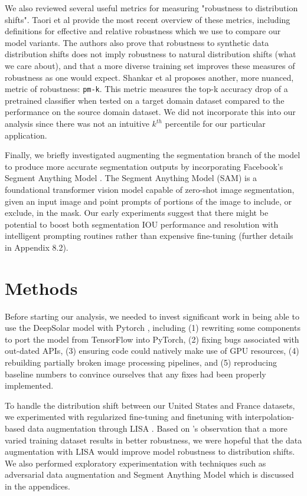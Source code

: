 \documentclass[10pt,twocolumn,letterpaper]{article}
\begin{document}
We also reviewed several useful metrics for measuring "robustness to distribution shifts". Taori et al \cite{Taori2020} provide the most recent overview of these metrics, including definitions for effective and relative robustness which we use to compare our model variants. The authors also prove that robustness to synthetic data distribution shifts does not imply robustness to natural distribution shifts (what we care about), and that a more diverse training set improves these measures of robustness as one would expect. Shankar et al \cite{shankar2019image} proposes another, more nuanced, metric of robustness: \texttt{pm-k}. This metric measures the top-k accuracy drop of a pretrained classifier when tested on a target domain dataset compared to the performance on the source domain dataset. We did not incorporate this into our analysis since there was not an intuitive $k^{th}$ percentile for our particular application.

Finally, we briefly investigated augmenting the segmentation branch of the model to produce more accurate segmentation outputs by incorporating Facebook's Segment Anything Model \cite{kirillov2023segment}. The Segment Anything Model  (SAM) is a foundational transformer vision model capable of zero-shot image segmentation, given an input image and point prompts of portions of the image to include, or exclude, in the mask. Our early experiments suggest that there might be potential to boost both segmentation IOU performance and resolution with intelligent prompting routines rather than expensive fine-tuning (further details in Appendix 8.2). 


\section{Methods}
Before starting our analysis, we needed to invest significant work in being able to use the DeepSolar model with Pytorch \cite{NEURIPS2019_9015}, including (1) rewriting some components to port the model from TensorFlow into PyTorch, (2) fixing bugs associated with out-dated APIs, (3) ensuring code could natively make use of GPU resources, (4) rebuilding partially broken image processing pipelines, and (5) reproducing baseline numbers to convince ourselves that any fixes had been properly implemented.

To handle the distribution shift between our United States and France datasets, we experimented with regularized fine-tuning \cite{li2021} and finetuning with interpolation-based data augmentation through LISA \cite{yao2022improving}. Based on \cite{Taori2020}'s observation that a more varied training dataset results in better robustness, we were hopeful that the data augmentation with LISA would improve model robustness to distribution shifts. We also performed exploratory experimentation with techniques such as adversarial data augmentation \cite{volpi2018generalizing} and Segment Anything Model \cite{kirillov2023segment} which is discussed in the appendices. 
\end{document}
